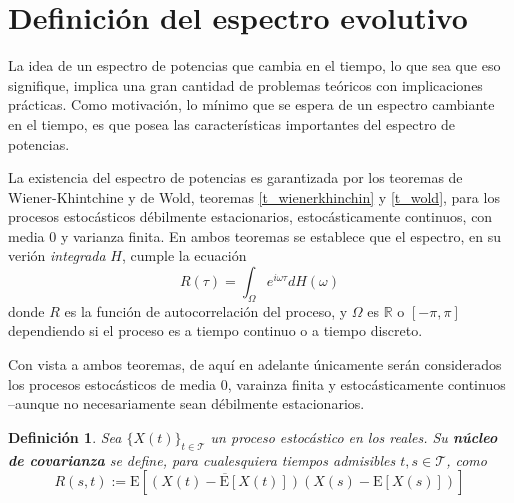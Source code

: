 \documentclass[12pt,letterpaper]{book}
\newtheorem{definicion}{Definición}[chapter]
\newcommand{\R}{\mathbb{R}}
\newcommand{\E}[1]{\mathrm{E}\left[ #1 \right]}
\newcommand{\xt}{$\{X(t)\}_{t\in \mathcal{T}}$ }
\begin{document}

\section{Definición del espectro evolutivo}
\label{sec:espectro}

La idea de un espectro de potencias que cambia en el tiempo, lo que sea que eso signifique, implica una gran cantidad de problemas teóricos con implicaciones prácticas.
%
Como motivación, lo mínimo que se espera de un espectro cambiante en el tiempo, es que posea las características importantes del espectro de potencias.

La existencia del espectro de potencias es garantizada por los teoremas de Wiener-Khintchine y de Wold, teoremas \ref{t_wienerkhinchin} y \ref{t_wold}, para los procesos estocásticos débilmente estacionarios, estocásticamente continuos, con media 0 y varianza finita.
%
En ambos teoremas se establece que el espectro, en su verión \textit{integrada} $H$, cumple la ecuación
\begin{equation}
R(\tau) = \int_\Omega e^{i \omega \tau} dH(\omega)
\label{lazy1}
\end{equation}
donde $R$ es la función de autocorrelación del proceso, y $\Omega$ es $\R$ o $[-\pi,\pi]$ dependiendo si el proceso es a tiempo continuo o a tiempo discreto.

Con vista a ambos teoremas, de aquí en adelante únicamente serán considerados los procesos estocásticos de media 0, varainza finita y estocásticamente continuos --aunque no necesariamente sean débilmente estacionarios.

\begin{definicion}
Sea \xt un proceso estocástico en los reales. Su \textbf{núcleo de covarianza} se define, para cualesquiera tiempos admisibles $t,s\in\mathcal{T}$, como
\begin{equation}
R(s,t) := \E{\overline{\left( X(t)-\E{X(t)} \right)}\left( X(s)-\E{X(s)} \right)}
\end{equation}
\label{s6:kernel}
\end{definicion}
\end{document}
